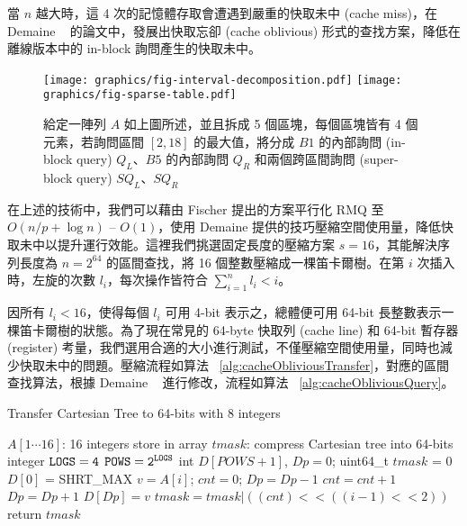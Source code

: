 \documentclass{gapd}
\begin{document}
當 $n$ 越大時，這 4 次的記憶體存取會遭遇到嚴重的快取未中 (cache miss)，在 Demaine ~\cite{demaine} 的論文中，發展出快取忘卻 (cache oblivious) 形式的查找方案，降低在離線版本中的 in-block 詢問產生的快取未中。

\begin{figure*}
  \centering
  \texttt{[image: graphics/fig-interval-decomposition.pdf]}
  \texttt{[image: graphics/fig-sparse-table.pdf]}
  \caption{給定一陣列 $A$ 如上圖所述，並且拆成 5 個區塊，每個區塊皆有 4 個元素，若詢問區間 $[2, 18]$ 的最大值，將分成 $B1$ 的內部詢問 (in-block query) $Q_L$、$B5$ 的內部詢問 $Q_R$ 和兩個跨區間詢問 (super-block query) $SQ_L$、$SQ_R$}
  \label{fig:interval-decomposition}
\end{figure*}

在上述的技術中，我們可以藉由 Fischer 提出的方案平行化 RMQ 至 $O(n / p + \log n)$ -- $O(1)$，使用 Demaine 提供的技巧壓縮空間使用量，降低快取未中以提升運行效能。這裡我們挑選固定長度的壓縮方案 $s = 16$，其能解決序列長度為 $n = 2^{64}$ 的區間查找，將 16 個整數壓縮成一棵笛卡爾樹。在第 $i$ 次插入時，左旋的次數 $l_i$，每次操作皆符合 $\sum_{i=1}^{n} l_i < i$。

因所有 $l_i < 16$，使得每個 $l_i$ 可用 4-bit 表示之，總體便可用 64-bit 長整數表示一棵笛卡爾樹的狀態。為了現在常見的 64-byte 快取列 (cache line) 和 64-bit 暫存器 (register) 考量，我們選用合適的大小進行測試，不僅壓縮空間使用量，同時也減少快取未中的問題。壓縮流程如算法 ~\ref{alg:cacheObliviousTransfer}，對應的區間查找算法，根據 Demaine ~\cite{demaine} 進行修改，流程如算法 ~\ref{alg:cacheObliviousQuery}。

\begin{algorithm*}
  \caption{Transfer Cartesian Tree to 64-bits with 8 integers}
  \label{alg:cacheObliviousTransfer}
  \begin{algorithmic}[1]
    \Require
      $A[1 \cdots 16]$: 16 integers store in array
    \Ensure 
      $\textit{tmask}$: compress Cartesian tree into 64-bits integer
      \State $\tt{LOGS} = 4$
      \State $\tt{POWS} = 2^{\tt{LOGS}}$
      \State int $D[POWS+1]$, $Dp = 0$;
      \State uint64\_t $tmask$ = $0$
      \State $D[0]$ = SHRT\_MAX
        \State $v = A[i]$;
        \State $cnt = 0$;
          \State $Dp = Dp-1$
          \State $cnt = cnt + 1$
        \EndWhile
        \State $Dp = Dp+1$
        \State $D[Dp] = v$
        \State $tmask = tmask | ((cnt)<<((i-1)<<2))$
      \EndFor
      \State return $tmask$
  \end{algorithmic}
\end{algorithm*}
\end{document}
